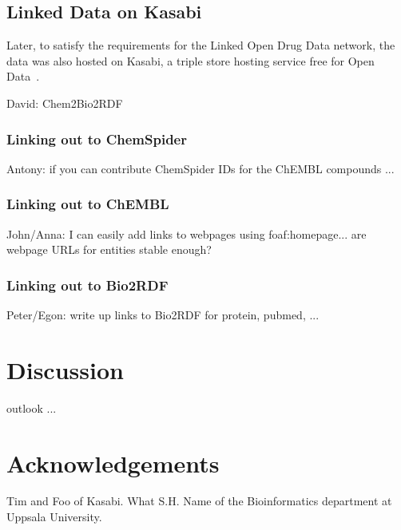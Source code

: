 \documentclass[sw]{iosart2c}
\begin{document}
\subsection{Linked Data on Kasabi}

Later, to satisfy the requirements for the Linked Open Drug Data \cite{Samwald2011}
network, the data was also hosted on Kasabi, a triple store hosting service
free for Open Data~\cite{kasabi}.

David: Chem2Bio2RDF



\subsubsection{Linking out to ChemSpider}

Antony: if you can contribute ChemSpider IDs for the ChEMBL compounds ...

\subsubsection{Linking out to ChEMBL}

John/Anna: I can easily add links to webpages using foaf:homepage... are webpage URLs for entities stable enough?

\subsubsection{Linking out to Bio2RDF}

Peter/Egon: write up links to Bio2RDF for protein, pubmed, ...

\section{Discussion}

outlook ...

\section{Acknowledgements}

Tim and Foo of Kasabi. What S.H. Name of the Bioinformatics department at Uppsala University.

\end{document}

